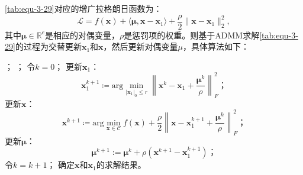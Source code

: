 \autoref{tab:equ-3-29}对应的增广拉格朗日函数为：
\begin{equation}
    \label{tab:equ-3-30}
    \mathcal{L} =f(\mathbf{x})+\langle \boldsymbol{\mu },\mathbf{x}-\mathbf{x}_1\rangle +\frac{\rho}{2}\parallel \mathbf{x}-\mathbf{x}_1\parallel_{2}^{2},
\end{equation}
其中$\boldsymbol{\mu } \in \mathbb{R} ^e$是相应的对偶变量，$\rho$是惩罚项的权重。则基于ADMM求解\autoref{tab:equ-3-29}的过程为交替更新$\mathbf{x}_1$和$\mathbf{x}$，然后更新对偶变量$\mu$，具体算法如下：

\begin{center}
\begin{algorithm}[!htbp]
        \caption{ADMM求解一般CCOP的流程} 
        \label{Algorithm-ADMM-CCOP} 
        \begin{algorithmic}[1]
        ；
        ；
        \STATE 令$k=0$；
            \STATE 更新$\mathbf{x}_1$：
            \begin{equation}
                \label{tab:equ-3-31}
                \mathbf{x}_{1}^{k+1}\coloneqq \mathrm{arg}\min_{|\mathbf{x}_1|_0\le r} \left\| \mathbf{x}^k-\mathbf{x}_1+\frac{\boldsymbol{\mu }^k}{\rho} \right\| _{F}^{2}\text{；}
            \end{equation}
            \STATE 更新$\mathbf{x}$：
            \begin{equation}
                \label{tab:equ-3-32}
                \mathbf{x}^{k+1}\coloneqq \mathrm{arg}\min_{\mathbf{x}\in \mathcal{C}} f(\mathbf{x})+\frac{\rho}{2}\left\| \mathbf{x}-\mathbf{x}_{1}^{k+1}+\frac{\boldsymbol{\mu }^k}{\rho} \right\| _{F}^{2}\text{；}
            \end{equation}
            \STATE 更新$\boldsymbol{\mu }$：
            \begin{equation}
                \label{tab:equ-3-33}
                \boldsymbol{\mu }^{k+1}:=\boldsymbol{\mu }^k+\rho \left( \mathbf{x}^{k+1}-\mathbf{x}_{1}^{k+1} \right)\text{；}
            \end{equation}
            \STATE 令$k=k+1$；
        \ENDWHILE
        \STATE 确定$\mathbf{x}$和$\mathbf{x}_1$的求解结果。
        \end{algorithmic}
\end{algorithm}
\end{center}


